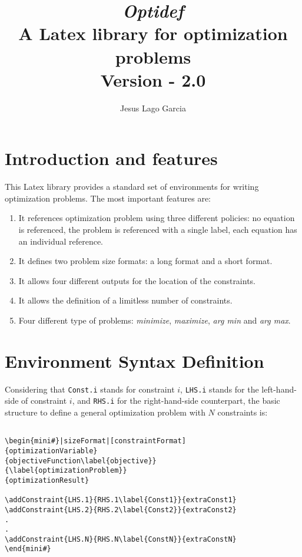 \documentclass[a4paper]{article}
\title{\textit{\textbf{Optidef}} \\ A Latex library for optimization problems\\ \textnormal{Version - 2.0}}
\author{Jesus Lago Garcia}
\begin{document}
\maketitle

\newpage

\tableofcontents

\newpage

\section{Introduction and features}

This Latex library provides a standard set of environments for writing optimization problems. The most important features are:
\begin{enumerate}
\item It references optimization problem using three different policies: no equation is referenced, the problem is referenced with a single label, each equation has an individual reference.
\item It defines two problem size formats: a long format and a short format.
\item It allows four different outputs for the location of the constraints.
\item It allows the definition of a limitless number of constraints.
\item Four different type of problems: \textit{minimize}, \textit{maximize}, \textit{arg min} and \textit{arg max}.
\end{enumerate}

\section{Environment Syntax Definition}
Considering that \verb|Const.i| stands for constraint $i$, \verb|LHS.i| stands for the left-hand-side of constraint $i$, and \verb|RHS.i| for the right-hand-side counterpart, the basic structure to define a general optimization problem with $N$ constraints is:
\begin{verbatim}

\begin{mini#}|sizeFormat|[constraintFormat]
{optimizationVariable}
{objectiveFunction\label{objective}}
{\label{optimizationProblem}}  
{optimizationResult}

\addConstraint{LHS.1}{RHS.1\label{Const1}}{extraConst1}
\addConstraint{LHS.2}{RHS.2\label{Const2}}{extraConst2}
.
.
\addConstraint{LHS.N}{RHS.N\label{ConstN}}{extraConstN}
\end{mini#}
\end{verbatim}
\end{document}
